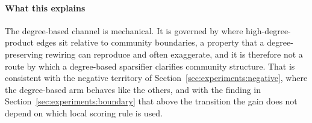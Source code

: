 \paragraph{What this explains}
The degree-based channel is mechanical. It is governed by where high-degree-product
edges sit relative to community boundaries, a property that a degree-preserving
rewiring can reproduce and often exaggerate, and it is therefore not a route by
which a degree-based sparsifier clarifies community structure. That is consistent
with the negative territory of Section~\ref{sec:experiments:negative}, where the
degree-based arm behaves like the others, and with the finding in
Section~\ref{sec:experiments:boundary} that above the transition the gain does not
depend on which local scoring rule is used.
